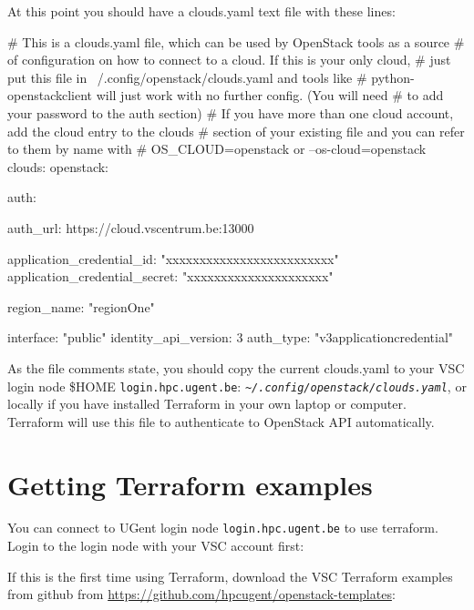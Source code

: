 At this point you should have a clouds.yaml text file with these lines:
\begin{code}{}
# This is a clouds.yaml file, which can be used by OpenStack tools as a source
# of configuration on how to connect to a cloud. If this is your only cloud,
# just put this file in ~/.config/openstack/clouds.yaml and tools like
# python-openstackclient will just work with no further config. (You will need
# to add your password to the auth section)
# If you have more than one cloud account, add the cloud entry to the clouds
# section of your existing file and you can refer to them by name with
# OS_CLOUD=openstack or --os-cloud=openstack
clouds:
  openstack:
    
    auth:
      
      auth_url: https://cloud.vscentrum.be:13000
      
      application_credential_id: "xxxxxxxxxxxxxxxxxxxxxxxxx"
      application_credential_secret: "xxxxxxxxxxxxxxxxxxxxx"
    
      
        
    region_name: "regionOne"
        
      
    interface: "public"
    identity_api_version: 3
    auth_type: "v3applicationcredential"
\end{code}

As the file comments state, you should copy the current clouds.yaml to your VSC login node \$HOME
\lstinline{login.hpc.ugent.be}: \texttt{\emph{\~\//.config/openstack/clouds.yaml}}, or locally
if you have installed \gls{Terraform} in your own laptop or computer.
\gls{Terraform} will use this file to authenticate to OpenStack API automatically.


\section{Getting Terraform examples}\label{sec:getting-terraform-templ}

You can connect to UGent login node \lstinline{login.hpc.ugent.be} to use terraform.
Login to the login node with your VSC account first:

\begin{prompt}
\end{prompt}

If this is the first time using Terraform, download the VSC Terraform examples from github from
\url{https://github.com/hpcugent/openstack-templates}:

